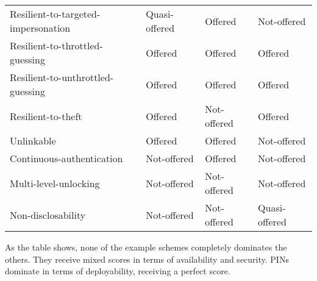 \begin{table}
\begin{tabular}{l|l|l|l}
    Resilient-to-targeted-impersonation & \cellcolor{yellow!25}Quasi-offered & \cellcolor{green!25}Offered       & \cellcolor{red!25}Not-offered      \\
    Resilient-to-throttled-guessing     & \cellcolor{green!25}Offered       & \cellcolor{green!25}Offered       & \cellcolor{green!25}Offered          \\
    Resilient-to-unthrottled-guessing   & \cellcolor{green!25}Offered       & \cellcolor{green!25}Offered       & \cellcolor{green!25}Offered          \\
    Resilient-to-theft                  & \cellcolor{green!25}Offered       & \cellcolor{red!25}Not-offered   & \cellcolor{green!25}Offered          \\
    Unlinkable                          & \cellcolor{green!25}Offered       & \cellcolor{green!25}Offered       & \cellcolor{red!25}Not-offered      \\
    Continuous-authentication           & \cellcolor{red!25}Not-offered   & \cellcolor{green!25}Offered       & \cellcolor{red!25}Not-offered      \\
    Multi-level-unlocking               & \cellcolor{red!25}Not-offered   & \cellcolor{red!25}Not-offered   & \cellcolor{red!25}Not-offered      \\
    Non-disclosability                  & \cellcolor{red!25}Not-offered   & \cellcolor{red!25}Not-offered   & \cellcolor{yellow!25}Quasi-offered    \\
    \end{tabular}
\end{table}

As the table shows, none of the example schemes completely dominates the others. They receive mixed scores in terms of availability and security. PINs dominate in terms of deployability, receiving a perfect score. 